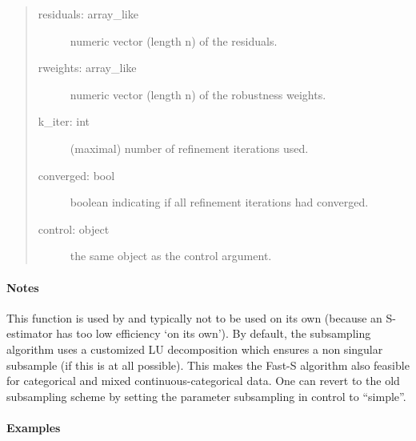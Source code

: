 \documentclass[letterpaper,10pt,english]{sphinxmanual}
\begin{document}
\begin{fulllineitems}
\begin{quote}
\begin{description}
\begin{description}
\begin{description}
\item[{residuals: array\_like}] \leavevmode
numeric vector (length n) of the residuals.

\item[{rweights: array\_like}] \leavevmode
numeric vector (length n) of the robustness weights.

\item[{k\_iter: int}] \leavevmode
(maximal) number of refinement iterations used.

\item[{converged: bool}] \leavevmode
boolean indicating if all refinement iterations had converged.

\item[{control: object}] \leavevmode
the same object as the control argument.

\end{description}

\end{description}

\end{description}\end{quote}
\paragraph{Notes}

This function is used by  and typically not to be used on its own (because an S-estimator
has too low efficiency ‘on its own’).
By default, the subsampling algorithm uses a customized LU decomposition which ensures a non
singular subsample (if this is at all possible). This makes the Fast-S algorithm also feasible for
categorical and mixed continuous-categorical data.
One can revert to the old subsampling scheme by setting the parameter subsampling in control
to “simple”.
\paragraph{Examples}


\end{fulllineitems}
\end{document}
